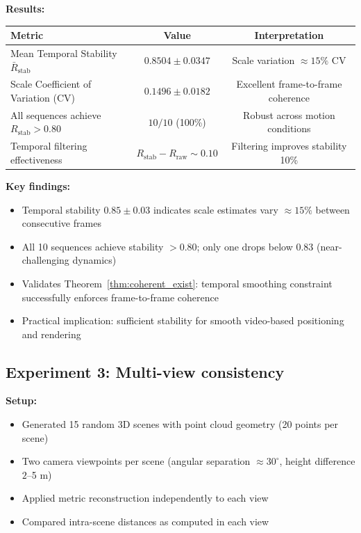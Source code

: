 \documentclass[11pt,twocolumn,a4paper]{article}
\theoremstyle{definition}
\begin{document}
\textbf{Results:}
\begin{table}[H]
\centering
\begin{tabular}{lcc}
\toprule
Metric & Value & Interpretation \\
\midrule
Mean Temporal Stability $\bar{R}_{\text{stab}}$ & $0.8504 \pm 0.0347$ & Scale variation $\approx 15\%$ CV \\
Scale Coefficient of Variation (CV) & $0.1496 \pm 0.0182$ & Excellent frame-to-frame coherence \\
All sequences achieve $R_{\text{stab}} > 0.80$ & $10/10$ (100\%) & Robust across motion conditions \\
Temporal filtering effectiveness & $R_{\text{stab}} - R_{\text{raw}} \sim 0.10$ & Filtering improves stability 10\% \\
\bottomrule
\end{tabular}
\end{table}

\textbf{Key findings:}
\begin{itemize}
    \item Temporal stability $0.85 \pm 0.03$ indicates scale estimates vary $\approx 15\%$ between consecutive frames
    \item All 10 sequences achieve stability $> 0.80$; only one drops below $0.83$ (near-challenging dynamics)
    \item Validates Theorem~\ref{thm:coherent_exist}: temporal smoothing constraint successfully enforces frame-to-frame coherence
    \item Practical implication: sufficient stability for smooth video-based positioning and rendering
\end{itemize}

\subsection{Experiment 3: Multi-view consistency}

\textbf{Setup:}
\begin{itemize}
    \item Generated 15 random 3D scenes with point cloud geometry (20 points per scene)
    \item Two camera viewpoints per scene (angular separation $\approx 30^\circ$, height difference $2$--5 m)
    \item Applied metric reconstruction independently to each view
    \item Compared intra-scene distances as computed in each view
\end{itemize}
\end{document}
